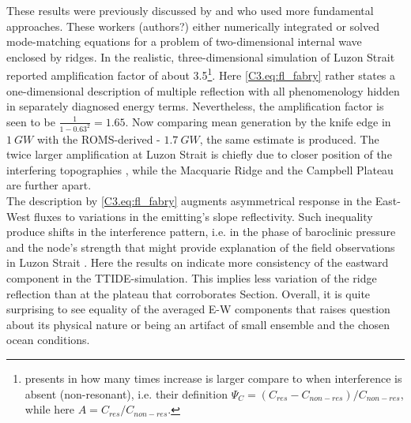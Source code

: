 \documentclass[12pt]{article}
\begin{document}
These results were previously discussed by \cite{buijsman2012double} and 
\cite{klymak2013parameterizing} who used more fundamental approaches. These workers (authors?) 
either numerically integrated or solved mode-matching equations for a problem of two-dimensional 
internal wave enclosed by ridges. In the realistic, three-dimensional simulation of 
Luzon Strait 
\citep{buijsman2014three} reported amplification factor of about 
3.5\footnote{\citep{buijsman2014three} presents in how many times increase is larger compare to 
when interference is absent (non-resonant), i.e. their definition 
$\Psi_C = (C_{res} - C_{non-res})/C_{non-res}$, while here $A = C_{res}/C_{non-res}$.}. Here 
\eqref{C3.eq:fl_fabry} rather states a one-dimensional description of multiple reflection 
with all phenomenology hidden in separately diagnosed energy terms. Nevertheless, the amplification 
factor is seen to be $\frac{1}{1 - 0.63^2} = 1.65$. Now comparing mean generation by the knife 
edge  in $1~GW$ with the ROMS-derived - $1.7~GW$, the same 
estimate is produced. The twice larger amplification at Luzon Strait is chiefly due to closer 
position of the interfering topographies \citep{klymak2013parameterizing}, while the Macquarie 
Ridge and the Campbell Plateau are further apart.\\

The description by \eqref{C3.eq:fl_fabry} augments asymmetrical response in the 
East-West fluxes to variations in the emitting's slope reflectivity. Such inequality produce 
shifts in the interference pattern, i.e. in the phase of baroclinic pressure and the node's 
strength that might provide explanation of the field observations in Luzon Strait 
\citep{buijsman2014three}. Here the results on  indicate more 
consistency of the eastward component in the TTIDE-simulation. This implies less variation of the 
ridge reflection than at the plateau that corroborates Section. Overall, it is quite surprising 
to see equality of the averaged E-W components that raises question about its physical nature or 
being an artifact of small ensemble and the chosen ocean conditions.\\
\end{document}
